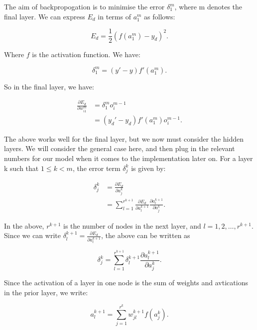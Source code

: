The aim of backpropogation is to minimise the error $\delta^m_1$, where m denotes the final layer. We can express $E_d$ in terms of $a_1^m$ as follows:

\begin{equation}
    E_d = \frac{1}{2} (f(a_1^m)-y_d)^2.
\end{equation}

Where $f$ is the activation function. We have:

\begin{equation}
    \delta_1^m = (y'-y)f'(a_1^m).
\end{equation}

So in the final layer, we have:

\begin{align}
    \frac{\partial E_d}{\partial w_{i1}^m} &= \delta_1^mo_i^{m-1} \\
                                           &= (y_d'-y_d)f'(a_1^m)o_i^{m-1}.
\end{align}

The above works well for the final layer, but we now must consider the hidden layers. We will consider the general case here, and then plug in the relevant
numbers for our model when it comes to the implementation later on. For a layer k such that $1 \leq k < m$, the error term $\delta^k_j$ is given by:

\begin{align}
    \delta_j^k &= \frac{\partial E_d}{\partial a_j^k} \\
               &= \sum_{l=1}^{r^{k+1}} \frac{\partial E_d}{\partial a_l^{k+1}}\frac{\partial a_l^{k+1}}{\partial a_j^k}.
\end{align}

In the above, $r^{k+1}$ is the number of nodes in the next layer, and $ l = 1,2,\ldots,r^{k+1}$. Since we can write $\delta_l^{k+1} = \frac{\partial E_d}{\partial a_l^{k+1}}$, the above can be written
as 

\begin{equation}
    \label{deltajk}
    \delta_j^k = \sum_{l=1}^{r^{k+1}}\delta_l^{k+1}\frac{\partial a_l^{k+1}}{\partial a_j^k}.
\end{equation}

Since the activation of a layer in one node is the sum of weights and avtications in the prior layer, we write:

\begin{equation}
    a_l^{k+1} = \sum^{r^k}_{j=1} w_{jl}^{k+1}f(a_j^k).
\end{equation}

